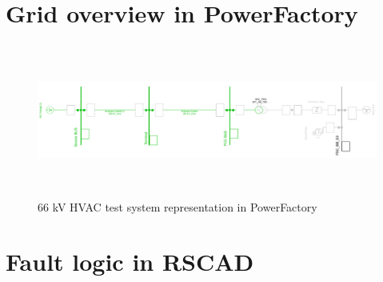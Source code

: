 \section{Grid overview in PowerFactory}
\begin{figure}[H]
\centering
    \includegraphics[height = 5cm,width = 17.5cm]{Diagrams/Appendix_B/WT1_AC_PFD_network_view.pdf}
    \caption{66 kV HVAC test system representation in PowerFactory}
    \label{fig:WT1_AC_PFD_network_view}
\end{figure}


\section{Fault logic in RSCAD}\label{fault_logic}
